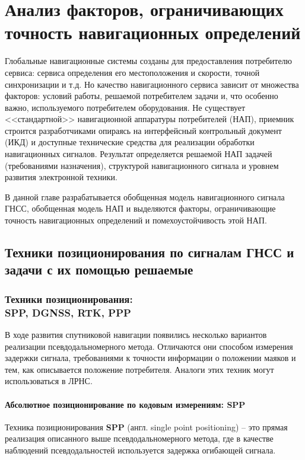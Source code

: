 \chapter{Анализ факторов, ограничивающих точность навигационных определений}
\label{cha:analysis}
\thispagestyle{chapterpage}
\renewcommand{\leftmark}{\oldleftmark}

Глобальные навигационные системы созданы для предоставления потребителю сервиса: сервиса определения его местоположения и скорости, точной синхронизации и т.д. 
Но качество навигационного сервиса зависит от множества факторов: условий работы, решаемой потребителем задачи и, что особенно важно, используемого потребителем оборудования. 
Не существует <<стандартной>> навигационной аппаратуры потребителей (НАП), приемник строится разработчиками опираясь на интерфейсный контрольный документ (ИКД) и доступные технические средства для реализации обработки навигационных сигналов. 
Результат определяется решаемой НАП задачей (требованиями назначения), структурой навигационного сигнала и уровнем развития электронной техники. 

В данной главе разрабатывается обобщенная модель навигационного сигнала ГНСС, обобщенная модель НАП и выделяются факторы, ограничивающие точность навигационных определений и помехоустойчивость этой НАП.


\section{Техники позиционирования по сигналам ГНСС и задачи с их помощью решаемые}


\subsection{Техники позиционирования: \\SPP, DGNSS, RTK, PPP}

В ходе развития спутниковой навигации появились несколько вариантов реализации псевдодальномерного метода. 
Отличаются они способом измерения задержки сигнала, требованиями к точности информации о положении маяков и тем, как описывается положение потребителя. 
Аналоги этих техник могут использоваться в ЛРНС.

\subsubsection{Абсолютное позиционирование по кодовым измерениям: SPP}

Техника позиционирования \textbf{SPP} (англ. single point positioning) -- это прямая реализация описанного выше псевдодальномерного метода, где в качестве наблюдений псевдодальностей используется задержка огибающей сигнала.

